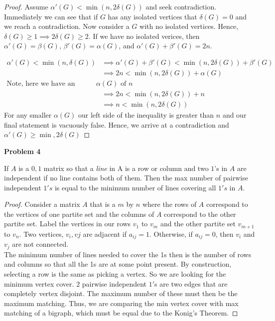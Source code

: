 \documentclass{article}
\newenvironment{claim}[2][Claim]{\begin{trivlist}
		\item[\hskip \labelsep {\bfseries #1}\hskip \labelsep {\bfseries #2}]}{\end{trivlist}}
\begin{document}
\begin{proof}
Assume $\alpha'(G) < \min(n, 2 \delta(G))$ and seek contradiction. Immediately we can see that if $G$ has any isolated vertices that $\delta(G) = 0$ and we reach a contradiction. Now consider a $G$ with no isolated vertices. Hence, $\delta(G) \geq 1 \implies 2\delta(G) \geq 2$. If we have no isolated verices, then $\alpha'(G) = \beta(G)$, $\beta'(G) = \alpha(G)$, and $\alpha'(G) + \beta'(G) = 2n$. 

\begin{align*}
	\alpha'(G) < \min (n, \delta(G)) & \implies \alpha'(G) + \beta'(G) < \min (n, 2\delta(G)) + \beta'(G)\\
	& \implies 2n < \min (n, 2\delta(G)) + \alpha(G) \\
	\text{Note, here we have an upperbound for } \alpha(G) \text{ of } n\\	
	& \implies 2n < \min (n, 2\delta(G)) + n\\
	& \implies n < \min (n, 2 \delta(G))
\end{align*}
For any smaller $\alpha(G)$ our left side of the inequality is greater than $n$ and our final statement is vacuously false. Hence, we arrive at a contradiction and $\alpha'(G) \geq \min{, 2 \delta(G)}$ 
\end{proof}

\noindent \textbf{Problem 4}
\begin{claim}{}
If $A$ is a $0, 1$ matrix so that a \textit{line} in A is a row or column and two $1$'s in $A$ are independent if no line contains both of them. Then the max number of pairwise independent $1's$ is equal to the minimum number of lines covering all $1's$ in $A$.
\end{claim}
\begin{proof}
Consider a matrix $A$ that is a $m$ by $n$ where the rows of $A$ correspond to the vertices of one partite set and the columns of $A$ correspond to the other partite set. Label the vertices in our rows $v_1$ to $v_m$ and the other partite set $v_{m + 1}$ to $v_n$. Two vertices, $v_i,vj$ are adjacent if $a_{ij} = 1$. Otherwise, if $a_{ij} = 0$, then $v_i$ and $v_j$ are not connected. \\
The minimum number of lines needed to cover the 1s then is the number of rows and columns so that all the 1s are at some point present. By construction, selecting a row is the same as picking a vertex.
So we are looking for the minimum vertex cover.
$2$ pairwise independent $1'$s are two edges that are completely vertex disjoint. The maximum number of these must then be the maximum matching. Thus, we are comparing the min vertex cover with max matching of a bigraph, which must be equal due to the Konig's Theorem.
\end{proof}
\end{document}
